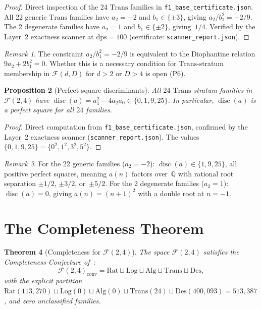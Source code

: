 \documentclass[12pt, reqno]{amsart}
\newtheorem{theorem}{Theorem}[section]
\newtheorem{proposition}[theorem]{Proposition}
\theoremstyle{definition}
\theoremstyle{remark}
\newtheorem{remark}[theorem]{Remark}
\newcommand{\Rat}{\mathrm{Rat}}
\newcommand{\Log}{\mathrm{Log}}
\newcommand{\Alg}{\mathrm{Alg}}
\newcommand{\Trans}{\mathrm{Trans}}
\newcommand{\Des}{\mathrm{Des}}
\DeclareMathOperator{\disc}{disc}
\begin{document}
\begin{proof}
Direct inspection of the 24 $\Trans$ families in
\texttt{f1\_base\_certificate.json}. All 22 generic $\Trans$ families
have $a_2 = -2$ and $b_1 \in \{\pm 3\}$, giving $a_2/b_1^2 = -2/9$.
The 2 degenerate families have $a_2 = 1$ and $b_1 \in \{\pm 2\}$,
giving~$1/4$. Verified by the Layer~2 exactness scanner
at $\mathrm{dps}=100$ (certificate: \texttt{scanner\_report.json}).
\end{proof}

\begin{remark}\label{rem:diophantine}
The constraint $a_2/b_1^2 = -2/9$ is equivalent
to the Diophantine relation $9a_2 + 2b_1^2 = 0$. Whether this
is a necessary condition for $\Trans$-stratum membership in
$\mathcal{F}(d,D)$ for $d > 2$ or $D > 4$ is open (P6).
\end{remark}

\begin{proposition}[Perfect square discriminants]\label{prop:disc}
All $24$ $\Trans$-stratum families in $\mathcal{F}(2,4)$ have
$\disc(a) = a_1^2 - 4a_2 a_0 \in \{0, 1, 9, 25\}$.
In particular, $\disc(a)$ is a perfect square for all
$24$ families.
\end{proposition}

\begin{proof}
Direct computation from \texttt{f1\_base\_certificate.json},
confirmed by the Layer~2 exactness scanner (\texttt{scanner\_report.json}).
The values $\{0, 1, 9, 25\} = \{0^2, 1^2, 3^2, 5^2\}$.
\end{proof}

\begin{remark}\label{rem:rootsep}
For the 22 generic families ($a_2 = -2$):
$\disc(a) \in \{1, 9, 25\}$, all positive perfect squares,
meaning $a(n)$ factors over~$\mathbb{Q}$ with rational root separation
$\pm 1/2$, $\pm 3/2$, or~$\pm 5/2$. For the 2 degenerate families
($a_2 = 1$): $\disc(a) = 0$, giving $a(n) = (n+1)^2$ with a
double root at $n = -1$.
\end{remark}


\section{The Completeness Theorem}\label{sec:completeness}

\begin{theorem}[Completeness for $\mathcal{F}(2,4)$]\label{thm:completeness}
The space $\mathcal{F}(2,4)$ satisfies the
Completeness Conjecture of~\cite{logladder}:
\[
  \mathcal{F}(2,4)_{\mathrm{conv}} = \Rat \sqcup \Log \sqcup \Alg \sqcup \Trans \sqcup \Des,
\]
with the explicit partition $\Rat(113{,}270) \sqcup \Log(0) \sqcup \Alg(0) \sqcup \Trans(24) \sqcup \Des(400{,}093) = 513{,}387$,
and zero unclassified families.
\end{theorem}
\end{document}
